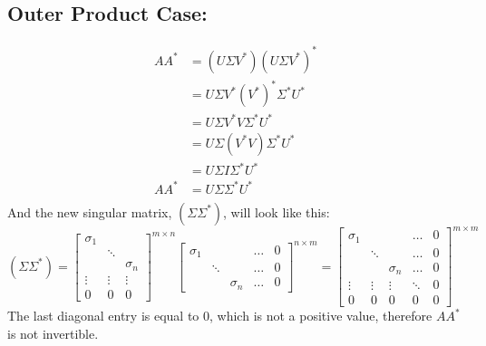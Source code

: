 \documentclass[fleqn]{article}
\begin{document}
\subsection*{Outer Product Case:}
\begin{equation*}
    \begin{split}
        AA^{*} &=  (U \Sigma V^{*}) (U \Sigma V^{*})^{*}\\
        &=  U \Sigma V^{*} (V^{*})^{*} \Sigma^{*} U^{*}\\
        &= U \Sigma V^{*} V \Sigma^{*} U^{*} \\
        &= U \Sigma ( V^{*} V ) \Sigma^{*} U^{*} \\
        &= U \Sigma I \Sigma^{*} U^{*} \\
        AA^{*} &= U \Sigma \Sigma^{*} U^{*}\\
    \end{split}
\end{equation*}
And the new singular matrix, $(\Sigma \Sigma^{*})$, will look like this: 
\begin{equation*}
    (\Sigma \Sigma^{*}) = \begin{bmatrix}\sigma_1 \\ & \ddots \\ & & \sigma_n \\ \vdots & \vdots & \vdots \\ 0 & 0 & 0 \end{bmatrix}^{m \times n} \begin{bmatrix}\sigma_1 & & & \dots & 0\\ & \ddots & & \dots & 0 \\ & & \sigma_n & \dots & 0\end{bmatrix}^{n \times m}  = \begin{bmatrix}\sigma_1 & & & \dots & 0\\ & \ddots & & \dots & 0\\ & & \sigma_n & \dots & 0\\ \vdots & \vdots & \vdots & \ddots & 0 \\ 0 & 0 & 0 & 0 & 0\end{bmatrix}^{m \times m}
\end{equation*}
The last diagonal entry is equal to $0$, which is not a positive value, therefore $AA^{*}$ is not invertible.
\end{document}
